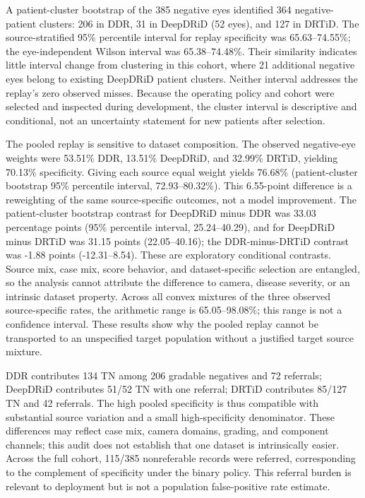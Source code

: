\documentclass{ieeeaccess}
\begin{document}
A patient-cluster bootstrap of the 385 negative eyes identified 364 negative-patient clusters: 206 in DDR, 31 in DeepDRiD (52 eyes), and 127 in DRTiD. The source-stratified 95\% percentile interval for replay specificity was 65.63--74.55\%; the eye-independent Wilson interval was 65.38--74.48\%. Their similarity indicates little interval change from clustering in this cohort, where 21 additional negative eyes belong to existing DeepDRiD patient clusters. Neither interval addresses the replay's zero observed misses. Because the operating policy and cohort were selected and inspected during development, the cluster interval is descriptive and conditional, not an uncertainty statement for new patients after selection.

The pooled replay is sensitive to dataset composition. The observed negative-eye weights were 53.51\% DDR, 13.51\% DeepDRiD, and 32.99\% DRTiD, yielding 70.13\% specificity. Giving each source equal weight yields 76.68\% (patient-cluster bootstrap 95\% percentile interval, 72.93--80.32\%). This 6.55-point difference is a reweighting of the same source-specific outcomes, not a model improvement. The patient-cluster bootstrap contrast for DeepDRiD minus DDR was 33.03 percentage points (95\% percentile interval, 25.24--40.29), and for DeepDRiD minus DRTiD was 31.15 points (22.05--40.16); the DDR-minus-DRTiD contrast was -1.88 points (-12.31--8.54). These are exploratory conditional contrasts. Source mix, case mix, score behavior, and dataset-specific selection are entangled, so the analysis cannot attribute the difference to camera, disease severity, or an intrinsic dataset property. Across all convex mixtures of the three observed source-specific rates, the arithmetic range is 65.05--98.08\%; this range is not a confidence interval. These results show why the pooled replay cannot be transported to an unspecified target population without a justified target source mixture.

DDR contributes 134 TN among 206 gradable negatives and 72 referrals; DeepDRiD contributes 51/52 TN with one referral; DRTiD contributes 85/127 TN and 42 referrals. The high pooled specificity is thus compatible with substantial source variation and a small high-specificity denominator. These differences may reflect case mix, camera domains, grading, and component channels; this audit does not establish that one dataset is intrinsically easier. Across the full cohort, 115/385 nonreferable records were referred, corresponding to the complement of specificity under the binary policy. This referral burden is relevant to deployment but is not a population false-positive rate estimate.
\end{document}
